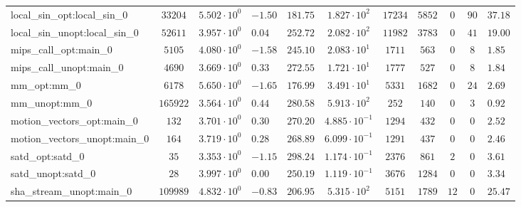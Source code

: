 \begin{tabular}{|l|c|HHc|c|c|c|c|cH|}
local\_sin\_opt:local\_sin\_0                   & $ 33204    $ & $ 5.502 \cdot 10^{0} $ & $ -1.50 $ & $ 181.75 $ & $ 1.827 \cdot 10^{2}  $ & $ 17234  $ & $ 5852  $ & $ 0   $ & $ 90  $ & $ 37.18   $ \\
local\_sin\_unopt:local\_sin\_0                 & $ 52611    $ & $ 3.957 \cdot 10^{0} $ & $ 0.04  $ & $ 252.72 $ & $ 2.082 \cdot 10^{2}  $ & $ 11982  $ & $ 3783  $ & $ 0   $ & $ 41  $ & $ 19.00   $ \\
mips\_call\_opt:main\_0                         & $ 5105     $ & $ 4.080 \cdot 10^{0} $ & $ -1.58 $ & $ 245.10 $ & $ 2.083 \cdot 10^{1}  $ & $ 1711   $ & $ 563   $ & $ 0   $ & $ 8   $ & $ 1.85    $ \\
mips\_call\_unopt:main\_0                       & $ 4690     $ & $ 3.669 \cdot 10^{0} $ & $ 0.33  $ & $ 272.55 $ & $ 1.721 \cdot 10^{1}  $ & $ 1777   $ & $ 527   $ & $ 0   $ & $ 8   $ & $ 1.84    $ \\
mm\_opt:mm\_0                                   & $ 6178     $ & $ 5.650 \cdot 10^{0} $ & $ -1.65 $ & $ 176.99 $ & $ 3.491 \cdot 10^{1}  $ & $ 5331   $ & $ 1682  $ & $ 0   $ & $ 24  $ & $ 2.69    $ \\
mm\_unopt:mm\_0                                 & $ 165922   $ & $ 3.564 \cdot 10^{0} $ & $ 0.44  $ & $ 280.58 $ & $ 5.913 \cdot 10^{2}  $ & $ 252    $ & $ 140   $ & $ 0   $ & $ 3   $ & $ 0.92    $ \\
motion\_vectors\_opt:main\_0                    & $ 132      $ & $ 3.701 \cdot 10^{0} $ & $ 0.30  $ & $ 270.20 $ & $ 4.885 \cdot 10^{-1} $ & $ 1294   $ & $ 432   $ & $ 0   $ & $ 0   $ & $ 2.52    $ \\
motion\_vectors\_unopt:main\_0                  & $ 164      $ & $ 3.719 \cdot 10^{0} $ & $ 0.28  $ & $ 268.89 $ & $ 6.099 \cdot 10^{-1} $ & $ 1291   $ & $ 437   $ & $ 0   $ & $ 0   $ & $ 2.46    $ \\
satd\_opt:satd\_0                               & $ 35       $ & $ 3.353 \cdot 10^{0} $ & $ -1.15 $ & $ 298.24 $ & $ 1.174 \cdot 10^{-1} $ & $ 2376   $ & $ 861   $ & $ 2   $ & $ 0   $ & $ 3.61    $ \\
satd\_unopt:satd\_0                             & $ 28       $ & $ 3.997 \cdot 10^{0} $ & $ 0.00  $ & $ 250.19 $ & $ 1.119 \cdot 10^{-1} $ & $ 3676   $ & $ 1284  $ & $ 0   $ & $ 0   $ & $ 3.34    $ \\
sha\_stream\_unopt:main\_0                      & $ 109989   $ & $ 4.832 \cdot 10^{0} $ & $ -0.83 $ & $ 206.95 $ & $ 5.315 \cdot 10^{2}  $ & $ 5151   $ & $ 1789  $ & $ 12  $ & $ 0   $ & $ 25.47   $ \\

\end{tabular}
